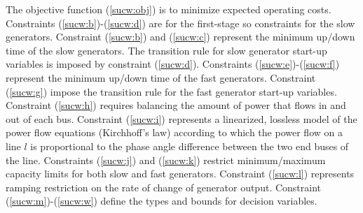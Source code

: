 The objective function (\ref{sucw:obj}) is to minimize expected operating costs. Constraints (\ref{sucw:b})-(\ref{sucw:d}) are for the first-stage so constraints for the slow generators. Constraint (\ref{sucw:b}) and (\ref{sucw:c}) represent the minimum up/down time of the slow generators. The transition rule for slow generator start-up variables is imposed by constraint (\ref{sucw:d}).  Constraints (\ref{sucw:e})-(\ref{sucw:f}) represent the minimum up/down time of the fast generators. Constraint (\ref{sucw:g}) impose the transition rule for the fast generator start-up variables. Constraint (\ref{sucw:h}) requires balancing the amount of power that flows in and out of each bus. Constraint (\ref{sucw:i}) represents a linearized, lossless model of the power flow equations (Kirchhoff's law) according to which the power flow on a line $l$ is proportional to the phase angle difference between the two end buses of the line. Constraints (\ref{sucw:j}) and (\ref{sucw:k}) restrict minimum/maximum capacity limits for both slow and fast generators. Constraint (\ref{sucw:l}) represents ramping restriction on the rate of change of generator output. Constraint (\ref{sucw:m})-(\ref{sucw:w}) define the types and bounds for decision variables.

